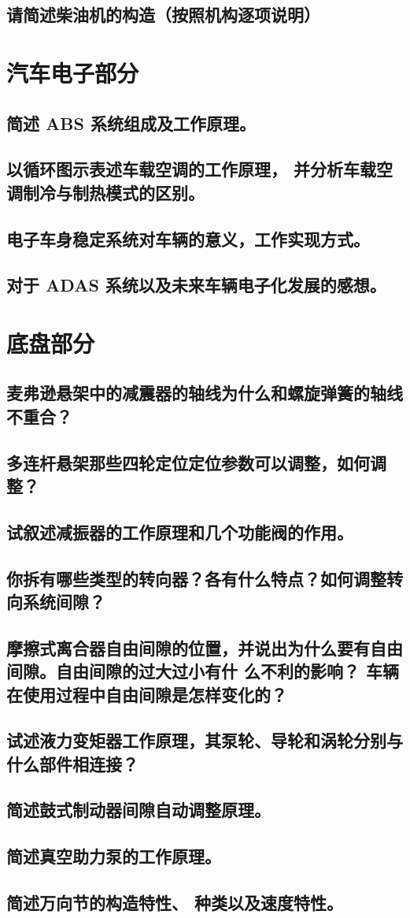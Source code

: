 \documentclass[UTF8]{ctexart}
\numberwithin{figure}{section}
\numberwithin{table}{section}
\begin{document}
\subsection{请简述柴油机的构造（按照机构逐项说明）}
\newpage

\section{汽车电子部分}
\subsection{简述 ABS 系统组成及工作原理。}
\subsection{以循环图示表述车载空调的工作原理， 并分析车载空调制冷与制热模式的区别。}
\subsection{电子车身稳定系统对车辆的意义，工作实现方式。}
\subsection{对于 ADAS 系统以及未来车辆电子化发展的感想。}
\newpage

\section{底盘部分}
\subsection{麦弗逊悬架中的减震器的轴线为什么和螺旋弹簧的轴线不重合？}
\subsection{多连杆悬架那些四轮定位定位参数可以调整，如何调整？}
\subsection{试叙述减振器的工作原理和几个功能阀的作用。}
\subsection{你拆有哪些类型的转向器？各有什么特点？如何调整转向系统间隙？}
\subsection{摩擦式离合器自由间隙的位置，并说出为什么要有自由间隙。自由间隙的过大过小有什
	么不利的影响？ 车辆在使用过程中自由间隙是怎样变化的？}
\subsection{试述液力变矩器工作原理，其泵轮、导轮和涡轮分别与什么部件相连接？}
\subsection{简述鼓式制动器间隙自动调整原理。}
\subsection{简述真空助力泵的工作原理。}
\subsection{简述万向节的构造特性、 种类以及速度特性。}
\newpage
\end{document}
